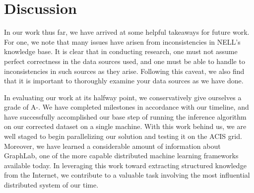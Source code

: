 \section{Discussion}
In our work thus far, we have arrived at some helpful takeaways for future work.
For one, we note that many issues have arisen from inconsistencies in NELL's knowledge base.
It is clear that in conducting research, one must not assume perfect correctness in the data sources used,
and one must be able to handle to inconsistencies in such sources as they arise.
Following this caveat, we also find that it is important to thoroughly examine your data sources
as we have done.

In evaluating our work at its halfway point, we conservatively give ourselves a grade of A-.
We have completed milestones in accordance with our timeline,
and have successfully accomplished our base step of running the inference algorithm
on our corrected dataset on a single machine.
With this work behind us, we are well staged to begin parallelizing our solution
and testing it on the ACIS grid.
Moreover, we have learned a considerable amount of information about GraphLab,
one of the more capable distributed machine learning frameworks available today.
In leveraging this work toward extracting structured knowledge from the Internet,
we contribute to a valuable task involving the most influential distributed system of our time.
